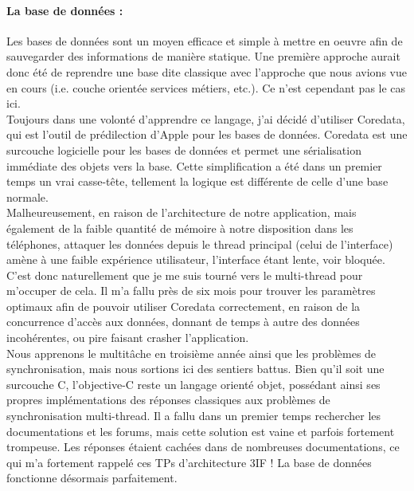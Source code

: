 \documentclass{article}
\begin{document}
		\paragraph{La base de données :}
		Les bases de données sont un moyen efficace et simple à mettre en oeuvre afin de sauvegarder des informations de manière statique. Une première approche aurait donc été de reprendre une base dite classique avec l'approche que nous avions vue en cours (i.e. couche orientée services métiers, etc.). Ce n'est cependant pas le cas ici.\\
			
		Toujours dans une volonté d'apprendre ce langage, j'ai décidé d'utiliser Coredata, qui est l'outil de prédilection d'Apple pour les bases de données. Coredata est une surcouche logicielle pour les bases de données et permet une sérialisation immédiate des objets vers la base. Cette simplification a été dans un premier temps un vrai casse-tête, tellement la logique est différente de celle d'une base normale. \\
		
		Malheureusement, en raison de l'architecture de notre application, mais également de la faible quantité de mémoire à notre disposition dans les téléphones, attaquer les données depuis le thread principal (celui de l'interface) amène à une faible expérience utilisateur, l'interface étant lente, voir bloquée. C'est donc naturellement que je me suis tourné vers le multi-thread pour m'occuper de cela. Il m'a fallu près de six mois pour trouver les paramètres optimaux afin de pouvoir utiliser Coredata correctement, en raison de la concurrence d'accès aux données, donnant de temps à autre des données incohérentes, ou pire faisant crasher l'application.\\
		
		Nous apprenons le multitâche en troisième année ainsi que les problèmes de synchronisation, mais nous sortions ici des sentiers battus. Bien qu'il soit une surcouche C, l'objective-C reste un langage orienté objet, possédant ainsi ses propres implémentations des réponses classiques aux problèmes de synchronisation multi-thread. Il a fallu dans un premier temps rechercher les documentations et les forums, mais cette solution est vaine et parfois fortement trompeuse. Les réponses étaient cachées dans de nombreuses documentations, ce qui m'a fortement rappelé ces TPs d'architecture 3IF ! La base de données fonctionne désormais parfaitement.\\
		
\end{document}
